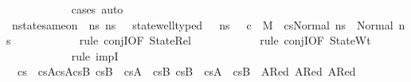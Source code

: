 \begin{isabellebody}
\ \ \ \ \ \ \ \ \ \ \isamarkupfalse%
\ {\isacharparenleft}{\kern0pt}cases{\isacharparenright}{\kern0pt}\ auto\isanewline
\ \ \ \ \ \ \ \ \isamarkupfalse%
\ {\isachardoublequoteopen}nstate{\isacharunderscore}{\kern0pt}same{\isacharunderscore}{\kern0pt}on\ {\isasymLambda}\ ns{\isacharprime}{\kern0pt}\ ns{}{\isacharprime}{\kern0pt}{\isacharprime}{\kern0pt}\ {\isacharbraceleft}{\kern0pt}{\isacharbraceright}{\kern0pt}\ {\isasymand}\ state{\isacharunderscore}{\kern0pt}well{\isacharunderscore}{\kern0pt}typed\ {\isasymLambda}\ {\isasymOmega}\ ns{}{\isacharprime}{\kern0pt}{\isacharprime}{\kern0pt}\ {\isasymand}\ {\isacharparenleft}{\kern0pt}{\isasymnot}\ c\ {\isasymlongrightarrow}\ M{\isacharcomma}{\kern0pt}{\isasymLambda}{\isacharcomma}{\kern0pt}{\isasymGamma}{\isacharcomma}{\kern0pt}{\isasymOmega}\ {\isasymturnstile}\ {\isasymlangle}cs{}{\isacharcomma}{\kern0pt}Normal\ ns{}{\isasymrangle}\ {\isacharbrackleft}{\kern0pt}{\isasymrightarrow}{\isacharbrackright}{\kern0pt}\ Normal\ ns{}{\isacharprime}{\kern0pt}{\isacharprime}{\kern0pt}{\isacharparenright}{\kern0pt}{\isachardoublequoteclose}\isanewline
\ \ \ \ \ \ \ \ \ \ \isamarkupfalse%
\ {\isacharparenleft}{\kern0pt}rule\ conjI{\isacharbrackleft}{\kern0pt}OF\ StateRel{}{\isacharbrackright}{\kern0pt}{\isacharparenright}{\kern0pt}\isanewline
\ \ \ \ \ \ \ \ \ \ \isamarkupfalse%
\ {\isacharparenleft}{\kern0pt}rule\ conjI{\isacharbrackleft}{\kern0pt}OF\ StateWt{}{\isacharbrackright}{\kern0pt}{\isacharparenright}{\kern0pt}\isanewline
\ \ \ \ \ \ \ \ \ \ \isamarkupfalse%
\ {\isacharparenleft}{\kern0pt}rule\ impI{\isacharparenright}{\kern0pt}\isanewline
\ \ \ \ \ \ \ \ \ \ \isamarkupfalse%
\ \ {\isacartoucheopen}cs{}\ {\isacharequal}{\kern0pt}\ {\isacharparenleft}{\kern0pt}cs{}A{\isacharat}{\kern0pt}cs{}A{\isacharprime}{\kern0pt}{\isacharparenright}{\kern0pt}{\isacharat}{\kern0pt}cs{}B{\isacharprime}{\kern0pt}{\isacartoucheclose}\ {\isacartoucheopen}cs{}B{\isacharprime}{\kern0pt}\ {\isacharequal}{\kern0pt}\ cs{}A{\isacharprime}{\kern0pt}{\isacharprime}{\kern0pt}\ {\isacharat}{\kern0pt}\ cs{}B{\isacharprime}{\kern0pt}{\isacharprime}{\kern0pt}{\isacartoucheclose}\ {\isacartoucheopen}cs{}B{\isacharprime}{\kern0pt}{\isacharprime}{\kern0pt}\ {\isacharequal}{\kern0pt}\ cs{}A{\isacharprime}{\kern0pt}{\isacharprime}{\kern0pt}{\isacharprime}{\kern0pt}\ {\isacharat}{\kern0pt}\ cs{}B{\isacharprime}{\kern0pt}{\isacharprime}{\kern0pt}{\isacharprime}{\kern0pt}{\isacartoucheclose}\ \ A{}Red{}\ A{}Red{}\ A{}Red{}\isanewline

\end{isabellebody}
